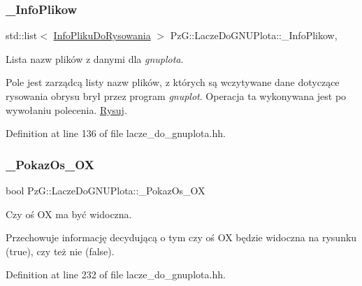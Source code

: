 \subsubsection{\texorpdfstring{\+\_\+\+Info\+Plikow}{\_InfoPlikow}}
{\footnotesize\ttfamily std\+::list$<$ \hyperlink{class_pz_g_1_1_info_pliku_do_rysowania}{Info\+Pliku\+Do\+Rysowania} $>$ Pz\+G\+::\+Lacze\+Do\+G\+N\+U\+Plota\+::\+\_\+\+Info\+Plikow\hspace{0.3cm}{\ttfamily [static]}, {\ttfamily [protected]}}



Lista nazw plików z danymi dla {\itshape gnuplota}. 

Pole jest zarządcą listy nazw plików, z których są wczytywane dane dotyczące rysowania obrysu brył przez program {\itshape gnuplot}. Operacja ta wykonywana jest po wywołaniu polecenia. \hyperlink{class_pz_g_1_1_lacze_do_g_n_u_plota_a065f5b8402737cc62b0ad4f66d028335}{Rysuj}. 

Definition at line 136 of file lacze\+\_\+do\+\_\+gnuplota.\+hh.

\mbox{\label{class_pz_g_1_1_lacze_do_g_n_u_plota_a833aa8994b9913786f920ec8c259731f}} 
\subsubsection{\texorpdfstring{\+\_\+\+Pokaz\+Os\+\_\+\+OX}{\_PokazOs\_OX}}
{\footnotesize\ttfamily bool Pz\+G\+::\+Lacze\+Do\+G\+N\+U\+Plota\+::\+\_\+\+Pokaz\+Os\+\_\+\+OX\hspace{0.3cm}{\ttfamily [protected]}}



Czy oś OX ma być widoczna. 

Przechowuje informację decydującą o tym czy oś OX będzie widoczna na rysunku ({\ttfamily true}), czy też nie ({\ttfamily false}). 

Definition at line 232 of file lacze\+\_\+do\+\_\+gnuplota.\+hh.

\mbox{\label{class_pz_g_1_1_lacze_do_g_n_u_plota_ae8d9b4dac5eae6ce86b7043c45b70ed8}} 
